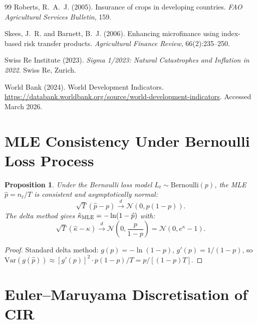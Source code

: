 \documentclass[12pt,a4paper]{article}
\newtheorem{proposition}[theorem]{Proposition}
\newcommand{\khat}{\hat{\kappa}}
\begin{document}
\begin{thebibliography}{99}
Roberts, R.~A.~J. (2005).
\newblock Insurance of crops in developing countries.
\newblock \textit{FAO Agricultural Services Bulletin}, 159.

Skees, J.~R. and Barnett, B.~J. (2006).
\newblock Enhancing microfinance using index-based risk transfer products.
\newblock \textit{Agricultural Finance Review}, 66(2):235--250.

Swiss Re Institute (2023).
\newblock \textit{Sigma 1/2023: Natural Catastrophes and Inflation in 2022}.
\newblock Swiss Re, Zurich.

World Bank (2024).
\newblock World Development Indicators.
\newblock \url{https://databank.worldbank.org/source/world-development-indicators}.
\newblock Accessed March 2026.

\end{thebibliography}

\appendix

\section{MLE Consistency Under Bernoulli Loss Process}
\label{app:mle}

\begin{proposition}
  Under the Bernoulli loss model $L_t\sim\text{Bernoulli}(p)$, the MLE
  $\hat{p}=n_\ell/T$ is consistent and asymptotically normal:
  \[
    \sqrt{T}(\hat{p}-p) \xrightarrow{d} \mathcal{N}(0,p(1-p)).
  \]
  The delta method gives $\khat_{\rm MLE}=-\ln(1-\hat{p})$ with:
  \[
    \sqrt{T}(\khat-\kappa) \xrightarrow{d} \mathcal{N}\!\left(0,\frac{p}{1-p}\right)
    = \mathcal{N}(0, e^\kappa - 1).
  \]
\end{proposition}
\begin{proof}
  Standard delta method: $g(p)=-\ln(1-p)$, $g'(p)=1/(1-p)$, so
  $\text{Var}(g(\hat{p}))\approx [g'(p)]^2\cdot p(1-p)/T = p/[(1-p)T]$.
\end{proof}

\section{Euler--Maruyama Discretisation of CIR}
\label{app:euler}
\end{document}
